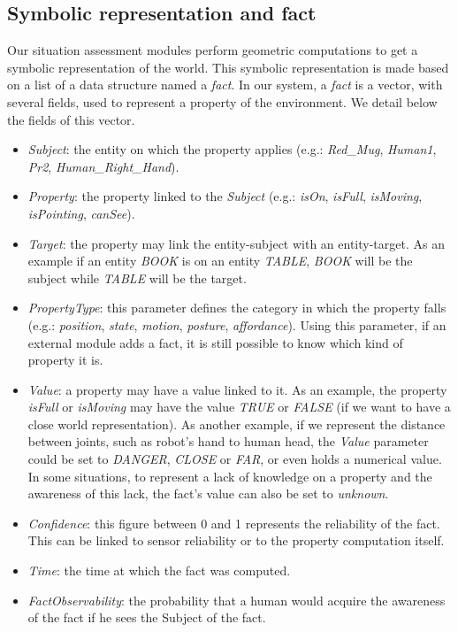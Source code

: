 \documentclass[a4paper]{article}
\begin{document}
 
\subsection{Symbolic representation and fact}
Our situation assessment modules perform geometric computations to get a symbolic representation of the world. This symbolic representation is made based on a list of a data structure named a \textit{fact}. In our system, a \textit{fact} is a vector, with several fields, used to represent a property of the environment. We detail below the fields of this vector.
\begin{itemize}
\item \textit{Subject}: the entity on which the property applies (e.g.: \textit{Red\_Mug}, \textit{Human1}, \textit{Pr2}, \textit{Human\_Right\_Hand}).
\item \textit{Property}: the property linked to the \textit{Subject} (e.g.: \textit{isOn}, \textit{isFull}, \textit{isMoving}, \textit{isPointing}, \textit{canSee}).
\item \textit{Target}: the property may link the entity-subject with an entity-target. As an example if an entity \textit{BOOK} is on an entity \textit{TABLE}, \textit{BOOK} will be the subject while \textit{TABLE} will be the target.
\item \textit{PropertyType}: this parameter defines the category in which the property falls (e.g.: \textit{position}, \textit{state}, \textit{motion}, \textit{posture}, \textit{affordance}). Using this parameter, if an external module adds a fact, it is still possible to know which kind of property it is.
\item \textit{Value}: a property may have a value linked to it. As an example, the property \textit{isFull} or \textit{isMoving} may have the value \textit{TRUE} or \textit{FALSE} (if we want to have a close world representation). As another example, if we represent the distance between joints, such as robot's hand to human head, the \textit{Value} parameter could be set to \textit{DANGER}, \textit{CLOSE} or \textit{FAR}, or even holds a numerical value.
In some situations, to represent a lack of knowledge on a property and the awareness of this lack, the fact's value can also be set to \textit{unknown}.
\item \textit{Confidence}: this figure between 0 and 1 represents the reliability of the fact. This can be linked to sensor reliability or to the property computation itself.
\item \textit{Time}: the time at which the fact was computed.
\item \textit{FactObservability}: the probability that a human would acquire the awareness of the fact if he sees the Subject of the fact. 
\end{itemize}
\end{document}
